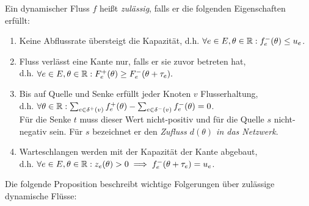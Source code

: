 \begin{definition}
	Ein dynamischer Fluss $f$ heißt \emph{zulässig}, falls er die folgenden Eigenschaften erfüllt:
	\begin{enumerate}[label=(F\arabic*)]
		\item\label{def-feasible-flow-capacity} Keine Abflussrate übersteigt die Kapazität, d.h. $\forall e\in E, \theta\in\mathbb{R}: f_e^-(\theta)\leq u_e$.
		\item\label{def-feasible-flow-no-negative-flow} Fluss verlässt eine Kante nur, falls er sie zuvor betreten hat,\\ d.h. $\forall e\in E, \theta\in\mathbb{R}: F_e^+(\theta) \geq F_e^-(\theta + \tau_e).$
		\item\label{def-feasible-flow-no-flow-at-node} Bis auf Quelle und Senke erfüllt jeder Knoten $v$ Flusserhaltung,\\
		d.h. $\forall\theta\in\mathbb{R}: \sum_{e\in\delta^+(v)}f^+_e(\theta) - \sum_{e\in\delta^-(v)} f_e^-(\theta) = 0$.\\
		Für die Senke $t$ muss dieser Wert nicht-positiv und für die Quelle $s$ nicht-negativ sein. 
		Für $s$ bezeichnet er den \emph{Zufluss $d(\theta)$ in das Netzwerk}.
		\item\label{def-feasible-flow-queue-with-capacity} Warteschlangen werden mit der Kapazität der Kante abgebaut,\\ d.h. $\forall e\in E, \theta\in\mathbb{R}: z_e(\theta) > 0 \implies f_e^-(\theta + \tau_e) = u_e$.
	\end{enumerate}
\end{definition}

Die folgende Proposition beschreibt wichtige Folgerungen über zulässige dynamische Flüsse:

